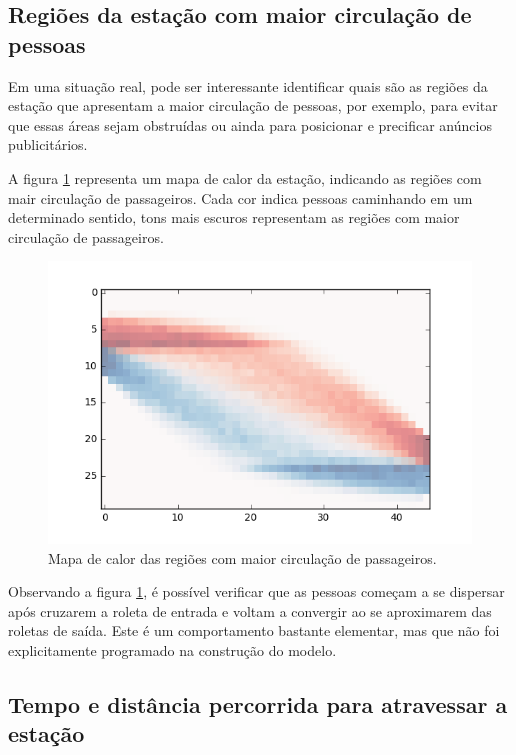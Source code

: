 \documentclass[preprint,12pt]{elsarticle}
\begin{document}
\subsection{Regiões da estação com maior circulação de pessoas}
\label{subsec:metro_heatmap}

Em uma situação real, pode ser interessante identificar quais são as regiões da estação que apresentam a maior circulação de pessoas, por exemplo, para evitar que essas áreas sejam obstruídas ou ainda para posicionar e precificar anúncios publicitários.

A figura \ref{fig:heatmap} representa um mapa de calor da estação, indicando as regiões com mair circulação de passageiros. Cada cor indica pessoas caminhando em um determinado sentido, tons mais escuros representam as regiões com maior circulação de passageiros.

\begin{figure}[H]
	\centering
	\includegraphics[totalheight=7cm]{figures/heatmap.png}
	\caption{Mapa de calor das regiões com maior circulação de passageiros.}
	\label{fig:heatmap}
\end{figure}

Observando a figura \ref{fig:heatmap}, é possível verificar que as pessoas começam a se dispersar após cruzarem a roleta de entrada e voltam a convergir ao se aproximarem das roletas de saída. Este é um comportamento bastante elementar, mas que não foi explicitamente programado na construção do modelo.

\subsection{Tempo e distância percorrida para atravessar a estação}
\label{subsec:tempo_travessia}
\end{document}
